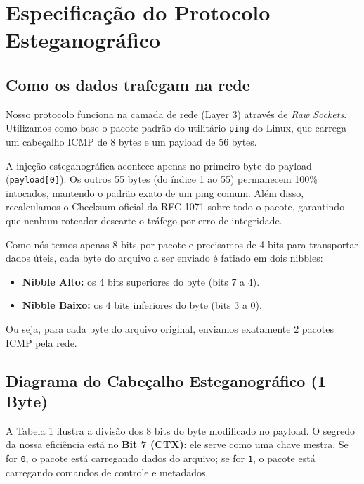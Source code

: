 \documentclass[12pt,a4paper]{article}
\begin{document}
\section{Especificação do Protocolo Esteganográfico}

\subsection{Como os dados trafegam na rede}
Nosso protocolo funciona na camada de rede (Layer 3) através de \textit{Raw Sockets}. Utilizamos como base o pacote padrão do utilitário \texttt{ping} do Linux, que carrega um cabeçalho ICMP de 8 bytes e um payload de 56 bytes.

A injeção esteganográfica acontece apenas no primeiro byte do payload (\texttt{payload[0]}). Os outros 55 bytes (do índice 1 ao 55) permanecem 100\% intocados, mantendo o padrão exato de um ping comum. Além disso, recalculamos o Checksum oficial da RFC 1071 sobre todo o pacote, garantindo que nenhum roteador descarte o tráfego por erro de integridade.

Como nós temos apenas 8 bits por pacote e precisamos de 4 bits para transportar dados úteis, cada byte do arquivo a ser enviado é fatiado em dois nibbles:
\begin{itemize}[leftmargin=*]
    \item \textbf{Nibble Alto:} os 4 bits superiores do byte (bits 7 a 4).
    \item \textbf{Nibble Baixo:} os 4 bits inferiores do byte (bits 3 a 0).
\end{itemize}
Ou seja, para cada byte do arquivo original, enviamos exatamente 2 pacotes ICMP pela rede.

\subsection{Diagrama do Cabeçalho Esteganográfico (1 Byte)}

A Tabela 1 ilustra a divisão dos 8 bits do byte modificado no payload. O segredo da nossa eficiência está no \textbf{Bit 7 (CTX)}: ele serve como uma chave mestra. Se for \texttt{0}, o pacote está carregando dados do arquivo; se for \texttt{1}, o pacote está carregando comandos de controle e metadados.
\end{document}
